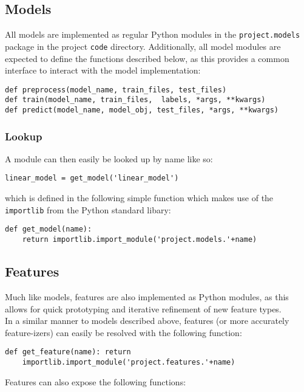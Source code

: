 \documentclass[
10pt, %
a4paper, %
oneside, %
headinclude,footinclude, %
BCOR5mm, %
]{scrartcl}
\begin{document}
\subsection{Models}

All models are implemented as regular Python modules in the
\texttt{project.models} package in the project \texttt{code} directory.
Additionally, all model modules are expected to define the functions described
below, as this provides a common interface to interact with the model
implementation: 
\begin{Verbatim}[frame=single]
def preprocess(model_name, train_files, test_files)
def train(model_name, train_files,  labels, *args, **kwargs)
def predict(model_name, model_obj, test_files, *args, **kwargs)
\end{Verbatim}

\subsubsection{Lookup}
\noindent A module can then easily be looked up by name like so:
\begin{Verbatim}[frame=single]
linear_model = get_model('linear_model')
\end{Verbatim}
\noindent which is defined in the following simple function which makes use
of the \texttt{importlib} from the Python standard libary:
\begin{Verbatim}[frame=single]
def get_model(name):
    return importlib.import_module('project.models.'+name)
\end{Verbatim}

\subsection{Features}

\noindent Much like models, features are also implemented as Python modules, as
this allows for quick prototyping and iterative refinement of new feature types.
\\

\noindent In a similar manner to models described above, features (or more
accurately feature-izers) can easily be resolved with the following function:

\begin{Verbatim}[frame=single]
def get_feature(name): return
    importlib.import_module('project.features.'+name)
\end{Verbatim}

\noindent Features can also expose the following functions:
\end{document}
